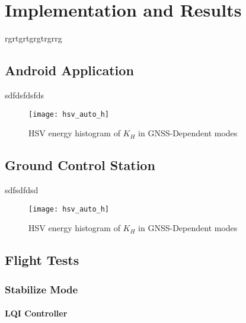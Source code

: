\chapter{Implementation and Results} \label{ch:implementation}
rgrtgrtgrgtrgrrg

\section{Android Application}
sdfdsfdsfds

\begin{figure}[h]
\begin{center}
\texttt{[image: hsv\_auto\_h]}  
\caption{HSV energy histogram of $K_H$ in GNSS-Dependent modes} 
\label{fig:APPlaunch}
\end{center}
\end{figure}

\section{Ground Control Station}
sdfsdfdsd

\begin{figure}[h]
\begin{center}
\texttt{[image: hsv\_auto\_h]}  
\caption{HSV energy histogram of $K_H$ in GNSS-Dependent modes} 
\label{fig:hsv_auto_h}
\end{center}
\end{figure}

\section{Flight Tests}

\subsection{Stabilize Mode}

\subsubsection{LQI Controller}

